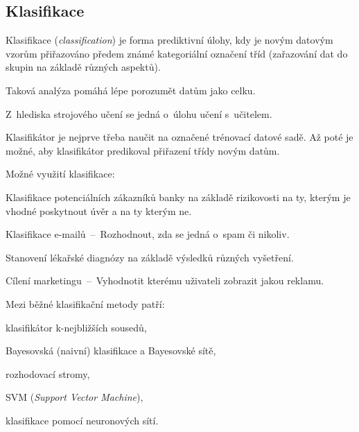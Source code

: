 \subsection{Klasifikace}

\begin{compactitem}
    \item Klasifikace (\textit{classification}) je forma prediktivní úlohy, kdy je novým datovým vzorům přiřazováno předem známé kategoriální označení tříd (zařazování dat do skupin na základě různých aspektů).

    \item Taková analýza pomáhá lépe porozumět datům jako celku.

    \item Z~hlediska strojového učení se jedná o~úlohu učení s~učitelem.

    \item Klasifikátor je nejprve třeba naučit na označené trénovací datové sadě. Až poté je možné, aby klasifikátor predikoval přiřazení třídy novým datům.

    \item Možné využití klasifikace: \begin{compactitem}
        \item Klasifikace potenciálních zákazníků banky na základě rizikovosti na ty, kterým je vhodné poskytnout úvěr a na ty kterým ne.

        \item Klasifikace e-mailů~--~Rozhodnout, zda se jedná o~spam či nikoliv.

        \item Stanovení lékařské diagnózy na základě výsledků různých vyšetření.

        \item Cílení marketingu~--~Vyhodnotit kterému uživateli zobrazit jakou reklamu.
    \end{compactitem}

    \item Mezi běžné klasifikační metody patří:

    \begin{compactitem}
        \item klasifikátor k-nejbližších sousedů,

        \item Bayesovská (naivní) klasifikace a Bayesovské sítě,

        \item rozhodovací stromy,

        \item SVM (\textit{Support Vector Machine}),

        \item klasifikace pomocí neuronových sítí.
    \end{compactitem}
\end{compactitem}


